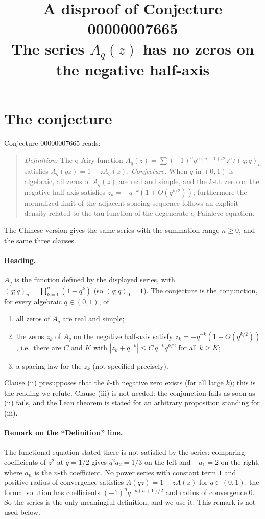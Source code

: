 \documentclass[11pt]{article}
\title{A disproof of Conjecture 00000007665\\[2pt]
\large The series $A_q(z)$ has no zeros on the negative half-axis}
\date{}
\theoremstyle{definition}
\theoremstyle{remark}
\renewcommand{\_}{\oldus\allowbreak}
\begin{document}
\sloppy
\maketitle

\section{The conjecture}

Conjecture 00000007665 reads:

\begin{quote}
\emph{Definition:} The q-Airy function $A_q(z)=\sum (-1)^n q^{n(n-1)/2} z^n/(q;q)_n$ satisfies
$A_q(qz)=1-z A_q(z)$. \emph{Conjecture:} When $q$ in $(0,1)$ is algebraic, all zeros of $A_q(z)$ are real
and simple, and the $k$-th zero on the negative half-axis satisfies $z_k = -q^{-k}(1+O(q^{k/2}))$;
furthermore the normalized limit of the adjacent spacing sequence follows an explicit density related to
the tau function of the degenerate q-Painleve equation.
\end{quote}
The Chinese version gives the same series with the summation range $n\ge 0$, and the same three clauses.

\paragraph{Reading.} $A_q$ is the function defined by the displayed series, with
$(q;q)_n=\prod_{k=1}^{n}(1-q^k)$ (so $(q;q)_0=1$). The conjecture is the conjunction, for every algebraic
$q\in(0,1)$, of
\begin{enumerate}[label=(\roman*)]
  \item all zeros of $A_q$ are real and simple;
  \item the zeros $z_k$ of $A_q$ on the negative half-axis satisfy $z_k=-q^{-k}(1+O(q^{k/2}))$, i.e.\
        there are $C$ and $K$ with $|z_k+q^{-k}|\le C\,q^{-k}q^{k/2}$ for all $k\ge K$;
  \item a spacing law for the $z_k$ (not specified precisely).
\end{enumerate}
Clause (ii) presupposes that the $k$-th negative zero exists (for all large $k$); this is the reading we
refute. Clause (iii) is not needed: the conjunction fails as soon as (ii) fails, and the Lean theorem is
stated for an arbitrary proposition standing for (iii).

\paragraph{Remark on the ``Definition'' line.} The functional equation stated there is not satisfied by
the series: comparing coefficients of $z^2$ at $q=1/2$ gives $q^2a_2=1/3$ on the left and $-a_1=2$ on the
right, where $a_n$ is the $n$-th coefficient. No power series with constant term $1$ and positive radius of convergence satisfies
$A(qz)=1-zA(z)$ for $q\in(0,1)$: the formal solution has coefficients $(-1)^nq^{-n(n+1)/2}$ and radius of
convergence $0$. So the series is the only meaningful definition, and we use it. This remark is not used
below.
\end{document}

